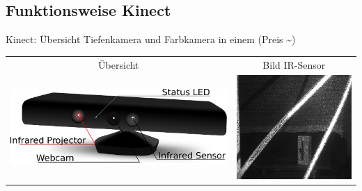 \documentclass{VLKlauck}
\begin{document}
	\subsection{Funktionsweise Kinect} 
	\begin{frame}{Kinect: Übersicht}
		Tiefenkamera und Farbkamera in einem (Preis \textasciitilde {})  
		
		\begin{tabular}{cc}
			Übersicht 								   & Bild IR-Sensor\\
			\includegraphics[scale=0.3]{Kinect.pdf}  & \includegraphics[scale=0.4]{ir_kinect.png}\\	
		\end{tabular}  
		
	\end{frame}
	
\end{document}

